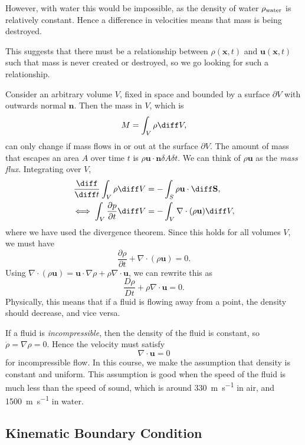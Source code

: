 \documentclass[12pt]{article}
\begin{document}
However, with water this would be impossible, as the density of water $\rho_{\rm{water}}$ is relatively constant. Hence a difference in velocities means that mass is being destroyed.

This suggests that there must be a relationship between $\rho(\mathbf{x},t)$ and $\mathbf{u}(\mathbf{x},t)$ such that mass is never created or destroyed, so we go looking for such a relationship.

Consider an arbitrary volume $V$, fixed in space and bounded by a surface $\partial V$ with outwards normal $\mathbf{n}$. Then the mass in $V$, which is
\[
M = \int_{V} \rho \diff V
,\]
can only change if mass flows in or out at the surface $\partial V$. The amount of mass that escapes an area $A$ over time $t$ is $\rho \mathbf{u} \cdot \mathbf{n} \delta A \delta t$. We can think of $\rho \mathbf{u}$ as the \emph{mass flux}. Integrating over $V$,
\begin{align*}
	\frac{\diff}{\diff t} \int_{V} \rho \diff V &= - \int_{S} \rho \mathbf{u} \cdot \diff \mathbf{S}, \\
	\iff \int_{V} \frac{\partial p}{\partial t} \diff V &= - \int_{V} \nabla \cdot (\rho \mathbf{u}) \diff V,
\end{align*}
where we have used the divergence theorem. Since this holds for all volumes $V$, we must have
\[
\frac{\partial \rho}{\partial t} + \nabla \cdot (\rho \mathbf{u}) = 0
.\]
Using $\nabla \cdot (\rho \mathbf{u}) = \mathbf{u} \cdot \nabla \rho + \rho \nabla \cdot \mathbf{u}$, we can rewrite this as
\[
\frac{D \rho}{Dt} + \rho \nabla \cdot \mathbf{u} = 0
.\]
Physically, this means that if a fluid is flowing away from a point, the density should decrease, and vice versa.

If a fluid is \emph{incompressible}, then the density of the fluid is constant, so $\dot \rho = \nabla \rho = 0$. Hence the velocity must satisfy
\[
\nabla \cdot \mathbf{u} = 0
\]
for incompressible flow. In this course, we make the assumption that density is constant and uniform. This assumption is good when the speed of the fluid is much less than the speed of sound, which is around \qty{330}{\metre\per\second} in air, and \qty{1500}{\metre\per\second} in water.

\subsection{Kinematic Boundary Condition}
\label{sub:kinematic_boundary_condition}
\end{document}
